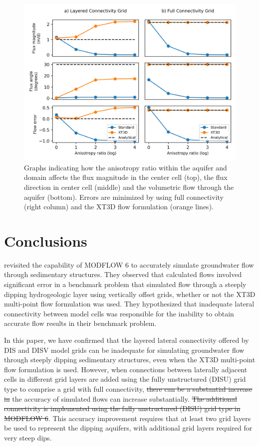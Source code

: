 \documentclass{article}
\begin{document}
\begin{figure}
	\begin{center}
	\includegraphics[scale=0.9]{../figures/fig5paper.png}
	\caption{Graphs indicating how the anisotropy ratio within the aquifer and domain affects the flux magnitude in the center cell (top), the flux direction in center cell (middle) and the volumetric flow through the aquifer (bottom). Errors are minimized by using full connectivity (right column) and the XT3D flow formulation (orange lines).}
	\label{fig:fig5}
	\end{center}
\end{figure}

\section*{Conclusions}

\cite{bardot2023} revisited the capability of MODFLOW 6 to accurately simulate groundwater flow through sedimentary structures. They observed that calculated flows involved significant error in a benchmark problem that simulated flow through a steeply dipping hydrogeologic layer using vertically offset grids, whether or not the XT3D multi-point flow formulation was used. They hypothesized that inadequate lateral connectivity between model cells was responsible for the inability to obtain accurate flow results in their benchmark problem.

In this paper, we have confirmed that the layered lateral connectivity offered by DIS and DISV model grids can be inadequate for simulating groundwater flow through steeply dipping sedimentary structures, even when the XT3D multi-point flow formulation is used.  However, when connections between laterally adjacent cells in different grid layers are added {\color{red}using the fully unstructured (DISU) grid type} to comprise a grid with full connectivity, {\color{red} \sout{there can be a substantial increase in }}the accuracy of simulated flows {\color{red}can increase substantially.\sout{  The additional connectivity is implemented using the fully unstructured (DISU) grid type in MODFLOW 6}}. This accuracy improvement requires that at least two grid layers be used to represent the dipping aquifers, with additional grid layers required for very steep dips.
\end{document}
